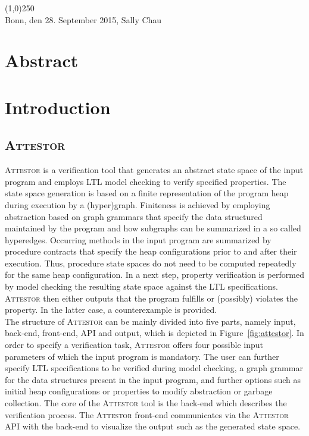 \documentclass[a4paper, 12pt, twoside]{report}
\begin{document}
	\noindent\line(1,0){250}\\
	Bonn, den 28. September 2015, Sally Chau
	
	\clearpage\mbox{}\clearpage
	
	\chapter*{Abstract}
	
	\clearpage\mbox{}\clearpage
	
	\doublespacing
	\tableofcontents
	\singlespacing
	\clearpage\mbox{}\clearpage
	\thispagestyle{empty} 
	
	\pagestyle{fancy}
	\fancyhead[RE]{\nouppercase\leftmark}
	\fancyhead[LO]{\nouppercase\rightmark}
	\fancyhead[LE,RO]{\thepage}
	\cfoot{}
	
	
	\chapter{Introduction}
	
	\section{\textsc{Attestor}}
	
	\textsc{Attestor} is a verification tool that generates an abstract state space of the input program and employs LTL model checking to verify specified properties. The state space generation is based on a finite representation of the program heap during execution by a (hyper)graph. Finiteness is achieved by employing abstraction based on graph grammars that specify the data structured maintained by the program and how subgraphs can be summarized in a so called hyperedges. Occurring methods in the input program are summarized by procedure contracts that specify the heap configurations prior to and after their execution. Thus, procedure state spaces do not need to be computed repeatedly for the same heap configuration. In a next step, property verification is performed by model checking the resulting state space against the LTL specifications. \textsc{Attestor} then either outputs that the program fulfills or (possibly) violates the property. In the latter case, a counterexample is provided.\\
	
	The structure of \textsc{Attestor} can be mainly divided into five parts, namely input, back-end, front-end, API and output, which is depicted in Figure~\ref{fig:attestor}. In order to specify a verification task, \textsc{Attestor} offers four possible input parameters of which the input program is mandatory. The user can further specify LTL specifications to be verified during model checking, a graph grammar for the data structures present in the input program, and further options such as initial heap configurations or properties to modify abstraction or garbage collection. The core of the \textsc{Attestor} tool is the back-end which describes the verification process. The \textsc{Attestor} front-end communicates via the \textsc{Attestor} API with the back-end to visualize the output such as the generated state space.\\	
	
\end{document}
